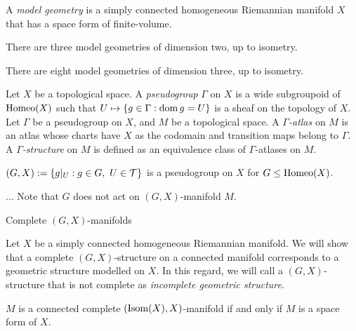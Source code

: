 \documentclass{../../large}
\begin{document}
\begin{prb}
A \emph{model geometry} is a simply connected homogeneous Riemannian manifold $X$ that has a space form of finite-volume.
\begin{parts}
\item There are three model geometries of dimension two, up to isometry.
\item There are eight model geometries of dimension three, up to isometry.
\end{parts}
\end{prb}
\begin{pf}

\end{pf}



\begin{prb}[$(G,X)$-manifolds]
Let $X$ be a topological space.
A \emph{pseudogroup} $\Gamma$ on $X$ is a wide subgroupoid of $\operatorname{Homeo}(X)$ such that $U\mapsto\{g\in\Gamma:\operatorname{dom} g=U\}$ is a sheaf on the topology of $X$.
Let $\Gamma$ be a pseudogroup on $X$, and $M$ be a topological space.
A \emph{$\Gamma$-atlas} on $M$ is an atlas whose charts have $X$ as the codomain and transition maps belong to $\Gamma$.
A \emph{$\Gamma$-structure} on $M$ is defined as an equivalence class of $\Gamma$-atlases on $M$.
\begin{parts}
\item $(G,X):=\{g|_U:g\in G,\ U\in\mathcal{T}\}$ is a pseudogroup on $X$ for $G\le\operatorname{Homeo}(X)$.
\item...
Note that $G$ does not act on $(G,X)$-manifold $M$.
\end{parts}
\end{prb}

\begin{prb}
Complete $(G,X)$-manifolds
\end{prb}

\begin{prb}
Let $X$ be a simply connected homogeneous Riemannian manifold.
We will show that a complete $(G,X)$-structure on a connected manifold corresponds to a geometric structure modelled on $X$.
In this regard, we will call a $(G,X)$-structure that is not complete as \emph{incomplete geometric structure}.
\begin{parts}
\item $M$ is a connected complete $(\operatorname{Isom}(X),X)$-manifold if and only if $M$ is a space form of $X$.
\end{parts}
\end{prb}
\end{document}
